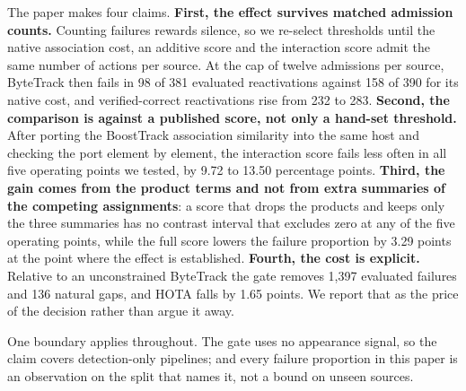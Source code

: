 The paper makes four claims. \textbf{First, the effect survives matched
admission counts.} Counting failures rewards silence, so we re-select
thresholds until the native association cost, an additive score and the
interaction score admit the same number of actions per source. At the cap
of twelve admissions per source, ByteTrack then fails in 98 of 381
evaluated reactivations against 158 of 390 for its native cost, and
verified-correct reactivations rise from 232 to 283. \textbf{Second, the
comparison is against a published score, not only a hand-set threshold.}
After porting the BoostTrack association similarity into the same host and
checking the port element by element, the interaction score fails less
often in all five operating points we tested, by 9.72 to 13.50 percentage
points. \textbf{Third, the gain comes from the product terms and not from
extra summaries of the competing assignments}: a score that drops the
products and keeps only the three summaries has no contrast interval that
excludes zero at any of the five operating points, while the full score
lowers the failure proportion by 3.29 points at the point where the effect
is established. \textbf{Fourth, the cost is
explicit.} Relative to an unconstrained ByteTrack the gate removes 1,397
evaluated failures and 136 natural gaps, and HOTA falls by 1.65 points. We
report that as the price of the decision rather than argue it away.

One boundary applies throughout. The gate uses no appearance signal, so
the claim covers detection-only pipelines; and every failure proportion in
this paper is an observation on the split that names it, not a bound on
unseen sources.
